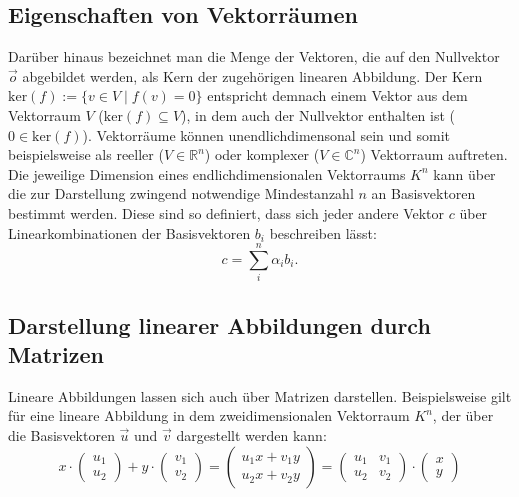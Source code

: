 \subsection{Eigenschaften von Vektorräumen}
Darüber hinaus bezeichnet man die Menge der Vektoren, die auf den Nullvektor $\vec{o}$ abgebildet werden, als Kern der zugehörigen linearen Abbildung. Der Kern $\mathrm{ker}(f):= \{v \in V \; \big\vert \; f(v) = 0 \}$ entspricht demnach einem Vektor aus dem Vektorraum $V$ ($\mathrm{ker}(f) \subseteq V$), in dem auch der Nullvektor enthalten ist ($0 \in \mathrm{ker}(f)$). Vektorräume können unendlichdimensonal sein und somit beispielsweise als reeller ($V \in \mathbb{R}^{n}$) oder komplexer ($V \in \mathbb{C}^{n}$) Vektorraum auftreten. Die jeweilige Dimension eines endlichdimensionalen Vektorraums $K^n$ kann über die zur Darstellung zwingend notwendige Mindestanzahl $n$ an Basisvektoren bestimmt werden. Diese sind so definiert, dass sich jeder andere Vektor $c$ über Linearkombinationen der Basisvektoren $b_i$ beschreiben lässt:
\begin{equation}
c = \sum_i^{n} \alpha_i b_i.
\end{equation}

\subsection{Darstellung linearer Abbildungen durch Matrizen}
Lineare Abbildungen lassen sich auch über Matrizen darstellen. Beispielsweise gilt für eine lineare Abbildung in dem zweidimensionalen Vektorraum $K^{n}$, der über die Basisvektoren $\vec{u}$ und $\vec{v}$ dargestellt werden kann:
\begin{equation}x \cdot \left(\begin{array}{c} u_1 \\ u_2 \end{array}\right) + y \cdot \left(\begin{array}{c} v_1 \\ v_2 \end{array}\right) = \left(\begin{array}{c} u_1 x + v_1 y \\ u_2 x + v_2 y \end{array}\right) = \left( \begin{array}{rr} u_1 & v_1 \\ u_2 & v_2 \end{array}\right) \cdot \left(\begin{array}{c} x \\ y \end{array}\right)
\end{equation}

